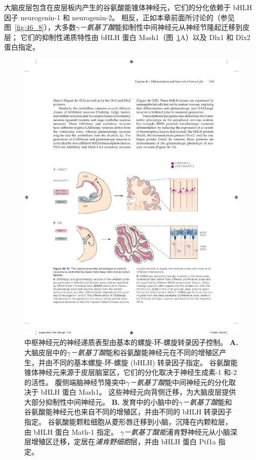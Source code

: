 大脑皮层包含在皮层板内产生的谷氨酸能锥体神经元，它们的分化依赖于 bHLH 因子 neurogenin-1 和 neurogenin-2。
相反，正如本章前面所讨论的（参见图~\ref{fig:46_8}），大多数\textit{$\gamma$－氨基丁酸}能抑制性中间神经元从神经节隆起迁移到皮层；
它们的抑制性递质特性由 bHLH 蛋白 Mash1（图~\ref{fig:46_12}A）以及 Dlx1 和 Dlx2 蛋白指定。


\begin{figure}[htbp]
	\centering
	\includegraphics[width=0.9\linewidth]{chap46/fig_46_12}
	\caption{中枢神经元的神经递质表型由基本的螺旋-环-螺旋转录因子控制。
		\textbf{A.} 大脑皮层中的\textit{$\gamma$－氨基丁酸}能和谷氨酸能神经元在不同的增殖区产生，并由不同的基本螺旋-环-螺旋 (bHLH) 转录因子指定。
		谷氨酸能锥体神经元来源于皮层脑室区，它们的分化取决于神经生成素-1 和-2 的活性。
		腹侧端脑神经节隆突中\textit{$\gamma$－氨基丁酸}能中间神经元的分化取决于 bHLH 蛋白 Mash1。
		这些神经元向背侧迁移，为大脑皮层提供大部分抑制性中间神经元。
		\textbf{B.} 发育中的小脑中的\textit{$\gamma$－氨基丁酸}能和谷氨酸能神经元也来自不同的增殖区，并由不同的 bHLH 转录因子指定。
		谷氨酸能颗粒细胞从菱形唇迁移到小脑，沉降在内颗粒层，由 bHLH 蛋白 Math-1 指定。
		\textit{$\gamma$－氨基丁酸能}浦肯野神经元从小脑深层增殖区迁移，定居在\textit{浦肯野细胞}层，并由 bHLH 蛋白 Ptf1a 指定。}
	\label{fig:46_12}
\end{figure}


